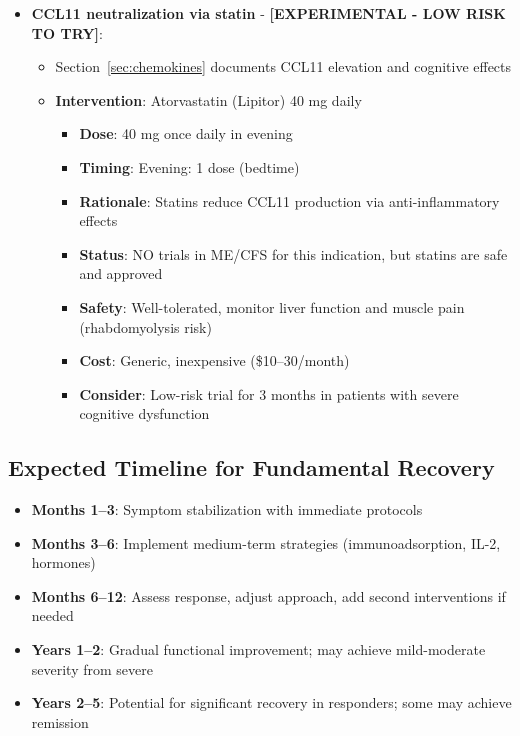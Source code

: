 \begin{itemize}
    \item \textbf{CCL11 neutralization via statin} - \textbf{[EXPERIMENTAL - LOW RISK TO TRY]}:
    \begin{itemize}
        \item Section~\ref{sec:chemokines} documents CCL11 elevation and cognitive effects
        \item \textbf{Intervention}: Atorvastatin (Lipitor) 40 mg daily
        \begin{itemize}
            \item \textbf{Dose}: 40 mg once daily in evening
            \item \textbf{Timing}: Evening: 1 dose (bedtime)
            \item \textbf{Rationale}: Statins reduce CCL11 production via anti-inflammatory effects
            \item \textbf{Status}: NO trials in ME/CFS for this indication, but statins are safe and approved
            \item \textbf{Safety}: Well-tolerated, monitor liver function and muscle pain (rhabdomyolysis risk)
            \item \textbf{Cost}: Generic, inexpensive (\$10--30/month)
            \item \textbf{Consider}: Low-risk trial for 3 months in patients with severe cognitive dysfunction
        \end{itemize}
    \end{itemize}
\end{itemize}

\subsection{Expected Timeline for Fundamental Recovery}

\begin{itemize}
    \item \textbf{Months 1--3}: Symptom stabilization with immediate protocols
    \item \textbf{Months 3--6}: Implement medium-term strategies (immunoadsorption, IL-2, hormones)
    \item \textbf{Months 6--12}: Assess response, adjust approach, add second interventions if needed
    \item \textbf{Years 1--2}: Gradual functional improvement; may achieve mild-moderate severity from severe
    \item \textbf{Years 2--5}: Potential for significant recovery in responders; some may achieve remission
\end{itemize}

